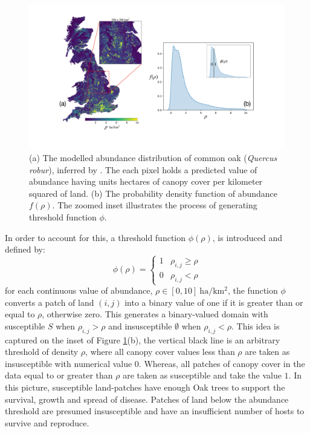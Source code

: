\begin{figure}
    \centering
    \includegraphics[scale=0.32]{chapter4/figures/figure3.pdf}
    \caption{(a) The modelled abundance distribution of common oak (\textit{Quercus robur}), inferred by \cite{hill.data}. The each pixel holds a predicted value of abundance having units hectares of canopy cover per kilometer squared of land. (b) The probability density function of abundance $f(\rho)$. The zoomed inset illustrates the process of generating threshold function $\phi$.}
    \label{fig:uk-oak-l.hill}
\end{figure}

In order to account for this, a threshold function $\phi(\rho)$, is introduced and defined by:
\begin{equation*}
  \phi(\rho) =
  \begin{cases}
    1 & \rho_{i,j}\geq\rho \\
    0 & \rho_{i,j}<\rho
  \end{cases}
\end{equation*}
for each continuous value of abundance, $\rho\in[0, 10]\ \mathrm{ha/km^{2}}$, the function %
 $\phi$ converts a patch of land $(i,j)$ into a binary value of one if it is greater than or %
 equal to $\rho$, otherwise zero. %
 This generates a binary-valued domain with susceptible $S$ when $\rho_{i,j} > \rho$ and %
 insusceptible $\emptyset$ when $\rho_{i,j} < \rho$. This idea is captured on the inset of %
 Figure \ref{fig:uk-oak-l.hill}(b), the vertical black line is an arbitrary threshold of %
 density $\rho$, where all canopy cover values less than $\rho$ are taken as insusceptible %
 with numerical value $0$. Whereas, all patches of canopy cover in the data equal to or greater %
 than $\rho$ are taken as susceptible and take the value $1$. In this picture, susceptible %
 land-patches have enough Oak trees to support the survival, growth and spread of disease. %
 Patches of land below the abundance threshold are presumed insusceptible and have an insufficient %
 number of hosts to survive and reproduce. %

